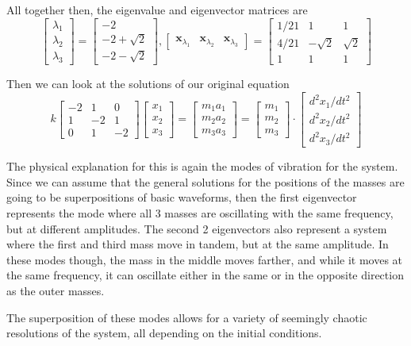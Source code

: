 \documentclass{article}
\begin{document}
\begin{solution}
All together then, the eigenvalue and eigenvector matrices are
\[ 
\begin{bmatrix}
\lambda_{1}\\
\lambda_{2}\\
\lambda_{3}
\end{bmatrix}
=
\begin{bmatrix}
-2\\
-2+\sqrt{2}\\
-2-\sqrt{2}
\end{bmatrix},
\begin{bmatrix}
\mathbf{x}_{\lambda_{1}}	&	\mathbf{x}_{\lambda_{2}}	&	\mathbf{x}_{\lambda_{3}}
\end{bmatrix}
=
\begin{bmatrix}
1/21	&	1			&	1\\
4/21	&	-\sqrt{2}	&	\sqrt{2}\\
1		&	1			&	1
\end{bmatrix}
\]

Then we can look at the solutions of our original equation
\[ k
\begin{bmatrix}
-2	&	1	&	0\\
1	&	-2	&	1\\
0	&	1	&	-2
\end{bmatrix}
\begin{bmatrix}
x_{1}\\
x_{2}\\
x_{3}
\end{bmatrix}
=
\begin{bmatrix}
m_{1}a_{1}\\
m_{2}a_{2}\\
m_{3}a_{3}
\end{bmatrix} 
=
\begin{bmatrix}
m_{1}\\
m_{2}\\
m_{3}
\end{bmatrix}
\cdot
\begin{bmatrix}
d^{2}x_{1}/dt^{2}\\
d^{2}x_{2}/dt^{2}\\
d^{2}x_{3}/dt^{2}
\end{bmatrix}
\]

The physical explanation for this is again the modes of vibration for the system. Since we can assume that the general solutions for the positions of the masses are going to be superpositions of basic waveforms, then the first eigenvector represents the mode where all 3 masses are oscillating with the same frequency, but at different amplitudes. The second 2 eigenvectors also represent a system where the first and third mass move in tandem, but at the same amplitude. In these modes though, the mass in the middle moves farther, and while it moves at the same frequency, it can oscillate either in the same or in the opposite direction as the outer masses.

The superposition of these modes allows for a variety of seemingly chaotic resolutions of the system, all depending on the initial conditions.
\end{solution}
\end{document}
